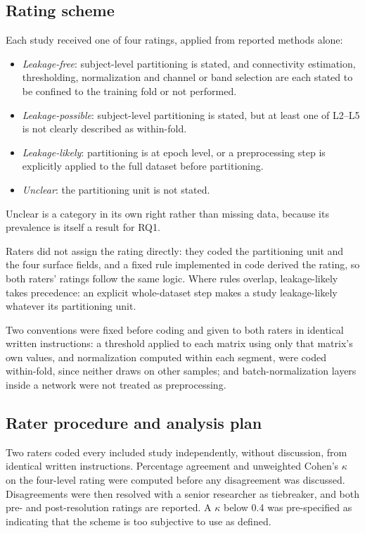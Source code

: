 \subsection{Rating scheme}
Each study received one of four ratings, applied from reported methods alone:
\begin{itemize}
\item \emph{Leakage-free}: subject-level partitioning is stated, and connectivity estimation, thresholding, normalization and channel or band selection are each stated to be confined to the training fold or not performed.
\item \emph{Leakage-possible}: subject-level partitioning is stated, but at least one of L2--L5 is not clearly described as within-fold.
\item \emph{Leakage-likely}: partitioning is at epoch level, or a preprocessing step is explicitly applied to the full dataset before partitioning.
\item \emph{Unclear}: the partitioning unit is not stated.
\end{itemize}
Unclear is a category in its own right rather than missing data, because its prevalence is itself a result for RQ1.

Raters did not assign the rating directly: they coded the partitioning unit and the four surface fields, and a fixed rule implemented in code derived the rating, so both raters' ratings follow the same logic. Where rules overlap, leakage-likely takes precedence: an explicit whole-dataset step makes a study leakage-likely whatever its partitioning unit.

Two conventions were fixed before coding and given to both raters in identical written instructions: a threshold applied to each matrix using only that matrix's own values, and normalization computed within each segment, were coded within-fold, since neither draws on other samples; and batch-normalization layers inside a network were not treated as preprocessing.

\subsection{Rater procedure and analysis plan}
Two raters coded every included study independently, without discussion, from identical written instructions. Percentage agreement and unweighted Cohen's $\kappa$ on the four-level rating were computed before any disagreement was discussed. Disagreements were then resolved with a senior researcher as tiebreaker, and both pre- and post-resolution ratings are reported. A $\kappa$ below 0.4 was pre-specified as indicating that the scheme is too subjective to use as defined.

